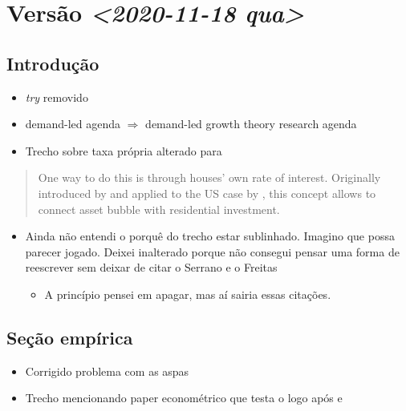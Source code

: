 \documentclass[11pt]{article}
\begin{document}
\section*{Versão \textit{<2020-11-18 qua>}}
\label{sec:org3393dea}

\subsection*{Introdução}
\label{sec:orgb6001f5}

\begin{itemize}
\item \emph{try} removido
\item demand-led agenda \(\Rightarrow\) demand-led growth theory research agenda
\item Trecho sobre taxa própria alterado para
\end{itemize}

\begin{quote}
One way to do this is through houses' own rate of interest.
Originally introduced by \textcite{Sraffa_Own_1932} and applied to the US case by \textcite{teixeira_crescimento_2015}, this concept allows to connect asset bubble with residential investment.
\end{quote}

\begin{itemize}
\item Ainda não entendi o porquê do trecho estar sublinhado. Imagino que possa parecer jogado. Deixei inalterado porque não consegui pensar uma forma de reescrever sem deixar de citar o Serrano e o Freitas
\begin{itemize}
\item A princípio pensei em apagar, mas aí sairia essas citações.
\end{itemize}
\end{itemize}

\subsection*{Seção empírica}
\label{sec:org7d66f27}

\begin{itemize}
\item Corrigido problema com as aspas
\item Trecho mencionando paper econométrico que testa o \cite{leamer_housing_2007} logo após \cite{fiebiger_semi-autonomous_2018} e \cite{fiebiger_trend_2017}
\end{itemize}
\end{document}
